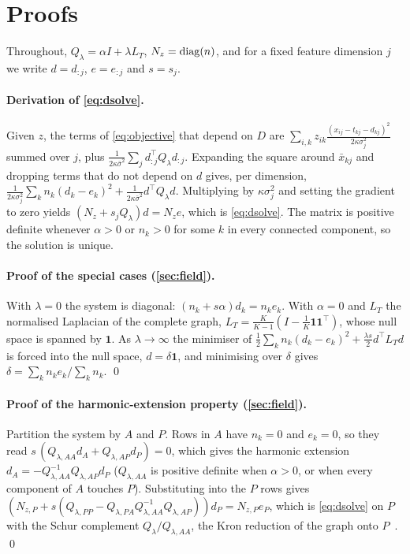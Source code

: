 \section{Proofs}
\label{sec:proofs}
Throughout, $Q_\lambda = \alpha I + \lambda L_T$, $N_z = \operatorname{diag}(n)$, and for a fixed feature dimension $j$ we write $d = d_{:j}$, $e = e_{:j}$ and $s = s_j$.

\paragraph{Derivation of \cref{eq:dsolve}.}
Given $z$, the terms of \cref{eq:objective} that depend on $D$ are $\sum_{i,k} z_{ik}\frac{(x_{ij} - t_{kj} - d_{kj})^2}{2\kappa\sigma_j^2}$ summed over $j$, plus $\frac{1}{2\kappa\bar\sigma^2}\sum_j d_{:j}^{\top}Q_\lambda d_{:j}$. Expanding the square around $\bar{x}_{kj}$ and dropping terms that do not depend on $d$ gives, per dimension, $\frac{1}{2\kappa\sigma_j^2}\sum_k n_k (d_k - e_k)^2 + \frac{1}{2\kappa\bar\sigma^2} d^{\top}Q_\lambda d$. Multiplying by $\kappa\sigma_j^2$ and setting the gradient to zero yields $(N_z + s_j Q_\lambda)d = N_z e$, which is \cref{eq:dsolve}. The matrix is positive definite whenever $\alpha>0$ or $n_k>0$ for some $k$ in every connected component, so the solution is unique.

\paragraph{Proof of the special cases (\cref{sec:field}).}
With $\lambda=0$ the system is diagonal: $(n_k + s\alpha)d_k = n_k e_k$. With $\alpha = 0$ and $L_T$ the normalised Laplacian of the complete graph, $L_T = \frac{K}{K-1}(I - \frac{1}{K}\mathbf{1}\mathbf{1}^{\top})$, whose null space is spanned by $\mathbf{1}$. As $\lambda\to\infty$ the minimiser of $\frac12\sum_k n_k(d_k-e_k)^2 + \frac{\lambda s}{2}d^{\top}L_Td$ is forced into the null space, $d = \delta\mathbf{1}$, and minimising over $\delta$ gives $\delta = \sum_k n_k e_k/\sum_k n_k$. \qed

\paragraph{Proof of the harmonic-extension property (\cref{sec:field}).}
Partition the system by $A$ and $P$. Rows in $A$ have $n_k = 0$ and $e_k = 0$, so they read $s\,(Q_{\lambda,AA}d_A + Q_{\lambda,AP}d_P) = 0$, which gives the harmonic extension $d_A = -Q_{\lambda,AA}^{-1}Q_{\lambda,AP}d_P$ ($Q_{\lambda,AA}$ is positive definite when $\alpha>0$, or when every component of $A$ touches $P$). Substituting into the $P$ rows gives $(N_{z,P} + s(Q_{\lambda,PP} - Q_{\lambda,PA}Q_{\lambda,AA}^{-1}Q_{\lambda,AP}))d_P = N_{z,P}e_P$, which is \cref{eq:dsolve} on $P$ with the Schur complement $Q_\lambda/Q_{\lambda,AA}$, the Kron reduction of the graph onto $P$~\cite{dorfler2013kron}. \qed

